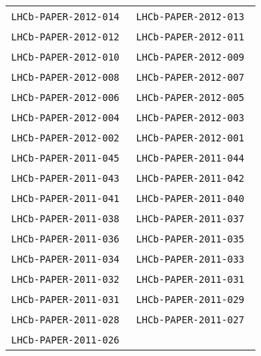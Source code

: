 \begin{center}
\begin{longtable}{ll}
\texttt{LHCb-PAPER-2012-014}~\cite{LHCb-PAPER-2012-014} & 
\texttt{LHCb-PAPER-2012-013}~\cite{LHCb-PAPER-2012-013} \\
\texttt{LHCb-PAPER-2012-012}~\cite{LHCb-PAPER-2012-012} & 
\texttt{LHCb-PAPER-2012-011}~\cite{LHCb-PAPER-2012-011} \\
\texttt{LHCb-PAPER-2012-010}~\cite{LHCb-PAPER-2012-010} & 
\texttt{LHCb-PAPER-2012-009}~\cite{LHCb-PAPER-2012-009} \\
\texttt{LHCb-PAPER-2012-008}~\cite{LHCb-PAPER-2012-008} & 
\texttt{LHCb-PAPER-2012-007}~\cite{LHCb-PAPER-2012-007} \\
\texttt{LHCb-PAPER-2012-006}~\cite{LHCb-PAPER-2012-006} & 
\texttt{LHCb-PAPER-2012-005}~\cite{LHCb-PAPER-2012-005} \\
\texttt{LHCb-PAPER-2012-004}~\cite{LHCb-PAPER-2012-004} & 
\texttt{LHCb-PAPER-2012-003}~\cite{LHCb-PAPER-2012-003} \\
\texttt{LHCb-PAPER-2012-002}~\cite{LHCb-PAPER-2012-002} & 
\texttt{LHCb-PAPER-2012-001}~\cite{LHCb-PAPER-2012-001} \\
\hline
\texttt{LHCb-PAPER-2011-045}~\cite{LHCb-PAPER-2011-045} & 
\texttt{LHCb-PAPER-2011-044}~\cite{LHCb-PAPER-2011-044} \\
\texttt{LHCb-PAPER-2011-043}~\cite{LHCb-PAPER-2011-043} & 
\texttt{LHCb-PAPER-2011-042}~\cite{LHCb-PAPER-2011-042} \\
\texttt{LHCb-PAPER-2011-041}~\cite{LHCb-PAPER-2011-041} & 
\texttt{LHCb-PAPER-2011-040}~\cite{LHCb-PAPER-2011-040} \\
\texttt{LHCb-PAPER-2011-038}~\cite{LHCb-PAPER-2011-038} &
\texttt{LHCb-PAPER-2011-037}~\cite{LHCb-PAPER-2011-037} \\
\texttt{LHCb-PAPER-2011-036}~\cite{LHCb-PAPER-2011-036} &
\texttt{LHCb-PAPER-2011-035}~\cite{LHCb-PAPER-2011-035} \\
\texttt{LHCb-PAPER-2011-034}~\cite{LHCb-PAPER-2011-034} &
\texttt{LHCb-PAPER-2011-033}~\cite{LHCb-PAPER-2011-033} \\
\texttt{LHCb-PAPER-2011-032}~\cite{LHCb-PAPER-2011-032} & 
\texttt{LHCb-PAPER-2011-031}~\cite{LHCb-PAPER-2011-031} \\
\texttt{LHCb-PAPER-2011-031}~\cite{LHCb-PAPER-2011-030} &
\texttt{LHCb-PAPER-2011-029}~\cite{LHCb-PAPER-2011-029} \\
\texttt{LHCb-PAPER-2011-028}~\cite{LHCb-PAPER-2011-028} &
\texttt{LHCb-PAPER-2011-027}~\cite{LHCb-PAPER-2011-027} \\
\texttt{LHCb-PAPER-2011-026}~\cite{LHCb-PAPER-2011-026} &

\end{longtable}
\end{center}
